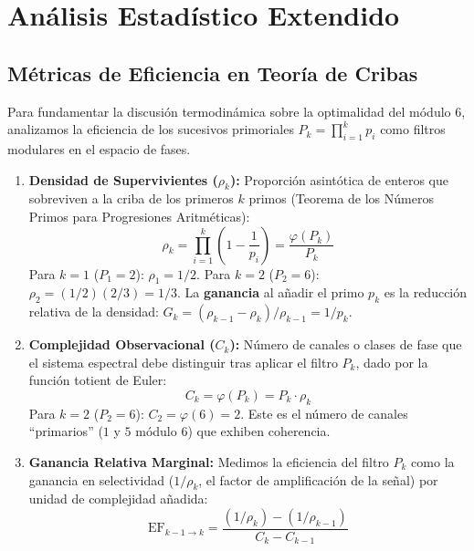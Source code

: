 \documentclass[12pt, a4paper]{article}
\theoremstyle{plain}
\theoremstyle{definition}
\theoremstyle{remark}
\begin{document}
\section{Análisis Estadístico Extendido}
\label{ap:estadistica}

\subsection{Métricas de Eficiencia en Teoría de Cribas}
\label{ap:eficiencia}

Para fundamentar la discusión termodinámica sobre la optimalidad del módulo 6, analizamos la eficiencia de los sucesivos primoriales $P_k = \prod_{i=1}^k p_i$ como filtros modulares en el espacio de fases.

\begin{enumerate}
    \item \textbf{Densidad de Supervivientes ($\rho_k$):} Proporción asintótica de enteros que sobreviven a la criba de los primeros $k$ primos (Teorema de los Números Primos para Progresiones Aritméticas):
    \[
    \rho_k = \prod_{i=1}^k \left(1 - \frac{1}{p_i}\right) = \frac{\varphi(P_k)}{P_k}
    \]
    Para $k=1$ ($P_1=2$): $\rho_1 = 1/2$. Para $k=2$ ($P_2=6$): $\rho_2 = (1/2)(2/3)=1/3$. La \textbf{ganancia} al añadir el primo $p_k$ es la reducción relativa de la densidad: $G_{k} = (\rho_{k-1} - \rho_k)/\rho_{k-1} = 1/p_k$.

    \item \textbf{Complejidad Observacional ($C_k$):} Número de canales o clases de fase que el sistema espectral debe distinguir tras aplicar el filtro $P_k$, dado por la función totient de Euler:
    \[
    C_k = \varphi(P_k) = P_k \cdot \rho_k
    \]
    Para $k=2$ ($P_2=6$): $C_2 = \varphi(6)=2$. Este es el número de canales ``primarios'' ($1$ y $5$ módulo $6$) que exhiben coherencia.

    \item \textbf{Ganancia Relativa Marginal:} Medimos la eficiencia del filtro $P_k$ como la ganancia en selectividad ($1/\rho_k$, el factor de amplificación de la señal) por unidad de complejidad añadida:
    \[
    \mathrm{EF}_{k-1 \to k} = \frac{(1/\rho_k) - (1/\rho_{k-1})}{C_k - C_{k-1}}
    \]
\end{enumerate}
\end{document}
